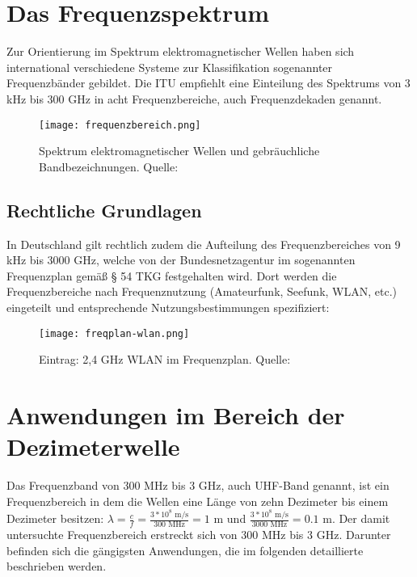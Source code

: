 \newpage
\section{Das Frequenzspektrum}
\label{section-frequenzbereiche}
Zur Orientierung im Spektrum elektromagnetischer Wellen haben sich international verschiedene Systeme zur Klassifikation sogenannter Frequenzbänder gebildet. Die \ac{ITU} empfiehlt eine Einteilung des Spektrums von 3 kHz bis 300 GHz in acht Frequenzbereiche, auch Frequenzdekaden genannt. \cite[vgl. ITU-R v.431-8]{itu-431:2015}

\begin{figure}[ht]
	\centering
	\texttt{[image: frequenzbereich.png]}
	\caption[Spektrum elektromagnetischer Wellen und gebräuchliche Bandbezeichnungen]{Spektrum elektromagnetischer Wellen und gebräuchliche Bandbezeichnungen. Quelle: \cite[Kark, S. 1]{Kark:2017}} 
	\label{frequenzbereiche}
\end{figure}




\subsection{Rechtliche Grundlagen}
In Deutschland gilt rechtlich zudem die Aufteilung des Frequenzbereiches von 9 kHz bis 3000 GHz, welche von der Bundesnetzagentur im sogenannten Frequenzplan \cite[Bundesnetzagentur, 2016]{bundesnetzagentur-frequenzplan:2016} gemäß § 54 TKG festgehalten wird.
Dort werden die Frequenzbereiche nach Frequenznutzung (Amateurfunk, Seefunk, WLAN, etc.) eingeteilt und entsprechende Nutzungsbestimmungen spezifiziert:

\begin{figure}[ht]
	\centering
	\texttt{[image: freqplan-wlan.png]}
	\caption[Eintrag: 2,4 GHz WLAN im Frequenzplan]{Eintrag: 2,4 GHz WLAN im Frequenzplan. Quelle: \cite[Bundesnetzagentur, 2016]{bundesnetzagentur-frequenzplan:2016}}
	\label{frequenzplan-wlan}
\end{figure}


\section{Anwendungen im Bereich der Dezimeterwelle}
Das Frequenzband von 300 MHz bis 3 GHz, auch \ac{UHF}-Band genannt, ist ein Frequenzbereich in dem die Wellen eine Länge von zehn Dezimeter bis einem Dezimeter besitzen:
\( \lambda = \frac{c}{f} = \frac{3*10^8 \text{ m/s}}{300 \text{ MHz}} = 1\text{ m}\)
und
\( \frac{3*10^8 \text{ m/s}}{3000 \text{ MHz}} = 0.1\text{ m}\).
Der damit untersuchte Frequenzbereich erstreckt sich von 300 MHz bis 3 GHz. Darunter befinden sich die gängigsten Anwendungen, die im folgenden detaillierte beschrieben werden.


